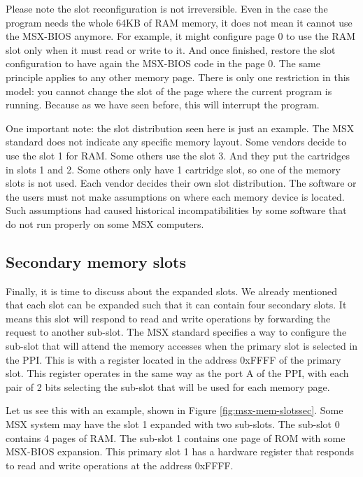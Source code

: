 Please note the slot reconfiguration is not irreversible. Even in the case the program needs the whole 64KB of RAM memory, it does not mean it cannot use the MSX-BIOS anymore. For example, it might configure page 0 to use the RAM slot only when it must read or write to it. And once finished, restore the slot configuration to have again the MSX-BIOS code in the page 0. The same principle applies to any other memory page. There is only one restriction in this model: you cannot change the slot of the page where the current program is running. Because as we have seen before, this will interrupt the program. 

One important note: the slot distribution seen here is just an example. The MSX standard does not indicate any specific memory layout. Some vendors decide to use the slot 1 for RAM. Some others use the slot 3. And they put the cartridges in slots 1 and 2. Some others only have 1 cartridge slot, so one of the memory slots is not used. Each vendor decides their own slot distribution. The software or the users must not make assumptions on where each memory device is located. Such assumptions had caused historical incompatibilities by some software that do not run properly on some MSX computers.

\subsection{Secondary memory slots}

Finally, it is time to discuss about the expanded slots. We already mentioned that each slot can be expanded such that it can contain four secondary slots. It means this slot will respond to read and write operations by forwarding the request to another sub-slot. The MSX standard specifies a way to configure the sub-slot that will attend the memory accesses when the primary slot is selected in the PPI. This is with a register located in the address 0xFFFF of the primary slot. This register operates in the same way as the port A of the PPI, with each pair of 2 bits selecting the sub-slot that will be used for each memory page. 

Let us see this with an example, shown in Figure \ref{fig:msx-mem-slotssec}. Some MSX system may have the slot 1 expanded with two sub-slots. The sub-slot 0 contains 4 pages of RAM. The sub-slot 1 contains one page of ROM with some MSX-BIOS expansion. This primary slot 1 has a hardware register that responds to read and write operations at the address 0xFFFF. 

